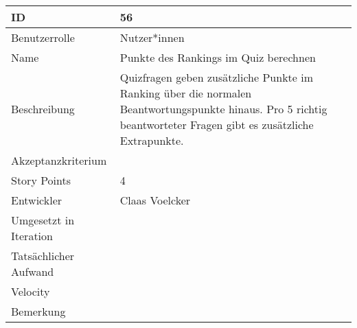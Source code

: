 \begin{tabularx}{\textwidth}{|p{}|X|}
	\hline
	ID & 56\\
	\hline
	Benutzerrolle & Nutzer*innen\\
	\hline
	Name & Punkte des Rankings im Quiz berechnen\\
	\hline
	Beschreibung & Quizfragen geben zusätzliche Punkte im Ranking über die normalen Beantwortungspunkte hinaus. Pro 5 richtig beantworteter Fragen gibt es zusätzliche Extrapunkte.\\
	\hline
	Akzeptanzkriterium & \\
	\hline
	Story Points & 4\\
	\hline
	Entwickler & Claas Voelcker\\
	\hline
	Umgesetzt in Iteration & \\ 
	\hline
	Tatsächlicher Aufwand & \\
	\hline
	Velocity & \\
	\hline
	Bemerkung & \\
	\hline
\end{tabularx}
\vspace{20pt}
